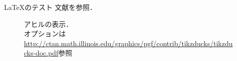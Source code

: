 \documentclass[
uplatex,%
Overleaf=true,%
dvipdfmx,%
b5ver_for_tokiyotosho/14Q,%
useotf,%
]{kbdbook9}
\begin{document}
\mainmatter
\LaTeX{}のテスト%
文献\cite{__2012}を参照．%

\begin{figure}
\centering
\OvlfDuck[speech=\textbf{Check!}]
\scalebox{0.5}{\OvlfDuck[think={\textsf{?}}]}%
\caption[]{アヒルの表示．\\
オプションは\url{http://ctan.math.illinois.edu/graphics/pgf/contrib/tikzducks/tikzducks-doc.pdf}参照}
\end{figure}
\scsnowman[hat=true,muffler=red,arms=true,scale=10]



\backmatter

\printindex
\end{document}
